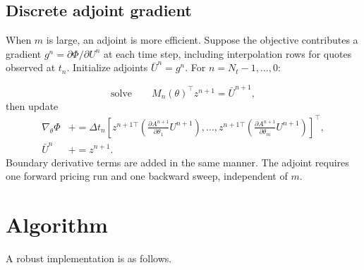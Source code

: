 \documentclass[11pt]{article}
\newcommand{\1}{\mathbf{1}}
\begin{document}
\subsection{Discrete adjoint gradient}

When $m$ is large, an adjoint is more efficient. Suppose the objective contributes a
gradient $g^n=\partial\Phi/\partial U^n$ at each time step, including interpolation rows
for quotes observed at $t_n$. Initialize adjoints $\bar U^n=g^n$. For
$n=N_t-1,\ldots,0$:

\[
  \text{solve}\qquad M_n(\theta)^\top z^{n+1}=\bar U^{n+1},
\]
then update
\begin{align}
  \nabla_\theta\Phi
  &\mathrel{+}=
  \Delta t_n
  \left[
  z^{n+1\top}
  \left(\frac{\partial A^{n+1}}{\partial\theta_1}U^{n+1}\right),
  \ldots,
  z^{n+1\top}
  \left(\frac{\partial A^{n+1}}{\partial\theta_m}U^{n+1}\right)
  \right]^\top,                                      \label{eq:adjoint_grad}\\
  \bar U^n&\mathrel{+}=z^{n+1}.
\end{align}
Boundary derivative terms are added in the same manner. The adjoint requires one forward
pricing run and one backward sweep, independent of $m$.

\section{Algorithm}

A robust implementation is as follows.
\end{document}

